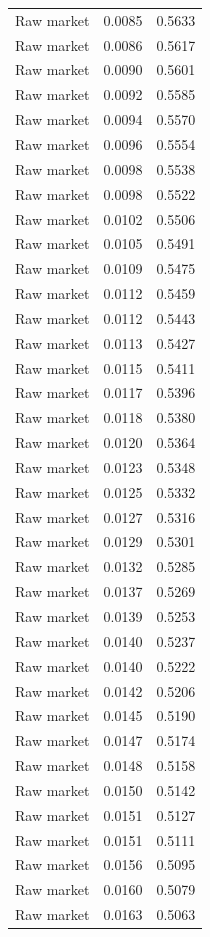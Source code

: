 \begin{table}[htbp]
\begin{tabular}{lll}
Raw market & 0.0085 & 0.5633 \\
Raw market & 0.0086 & 0.5617 \\
Raw market & 0.0090 & 0.5601 \\
Raw market & 0.0092 & 0.5585 \\
Raw market & 0.0094 & 0.5570 \\
Raw market & 0.0096 & 0.5554 \\
Raw market & 0.0098 & 0.5538 \\
Raw market & 0.0098 & 0.5522 \\
Raw market & 0.0102 & 0.5506 \\
Raw market & 0.0105 & 0.5491 \\
Raw market & 0.0109 & 0.5475 \\
Raw market & 0.0112 & 0.5459 \\
Raw market & 0.0112 & 0.5443 \\
Raw market & 0.0113 & 0.5427 \\
Raw market & 0.0115 & 0.5411 \\
Raw market & 0.0117 & 0.5396 \\
Raw market & 0.0118 & 0.5380 \\
Raw market & 0.0120 & 0.5364 \\
Raw market & 0.0123 & 0.5348 \\
Raw market & 0.0125 & 0.5332 \\
Raw market & 0.0127 & 0.5316 \\
Raw market & 0.0129 & 0.5301 \\
Raw market & 0.0132 & 0.5285 \\
Raw market & 0.0137 & 0.5269 \\
Raw market & 0.0139 & 0.5253 \\
Raw market & 0.0140 & 0.5237 \\
Raw market & 0.0140 & 0.5222 \\
Raw market & 0.0142 & 0.5206 \\
Raw market & 0.0145 & 0.5190 \\
Raw market & 0.0147 & 0.5174 \\
Raw market & 0.0148 & 0.5158 \\
Raw market & 0.0150 & 0.5142 \\
Raw market & 0.0151 & 0.5127 \\
Raw market & 0.0151 & 0.5111 \\
Raw market & 0.0156 & 0.5095 \\
Raw market & 0.0160 & 0.5079 \\
Raw market & 0.0163 & 0.5063 \\

\end{tabular}
\end{table}
